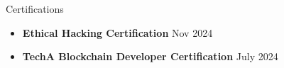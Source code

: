 \documentclass{resume} %
\begin{document}
\begin{rSection}{Certifications}
    \begin{itemize}

        \item \textbf{Ethical Hacking Certification} \hfill Nov 2024
              

        \item \textbf{TechA Blockchain Developer Certification} \hfill July 2024





\end{itemize}
\end{rSection}
\end{document}
